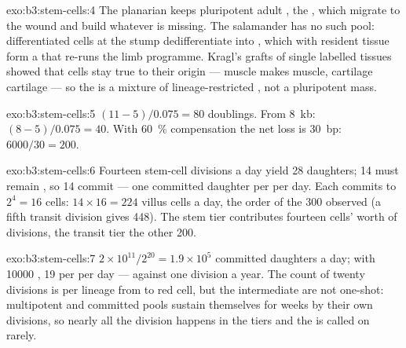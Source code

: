 \begin{solution}{exo:b3:stem-cells:4}
The planarian keeps pluripotent adult , the , which
migrate to the wound and build whatever is missing. The salamander has
no such pool: differentiated cells at the stump dedifferentiate into
, which with resident tissue  form a 
that re-runs the limb programme. Kragl's grafts of single labelled
tissues showed that  cells stay true to their origin ---
muscle makes muscle, cartilage cartilage --- so the  is a
mixture of lineage-restricted , not a pluripotent mass.
\end{solution}

\begin{solution}{exo:b3:stem-cells:5}
$(11 - 5)/0.075 = 80$ doublings. From \qty{8}{kb}: $(8 - 5)/0.075 = 40$.
With \qty{60}{\%} compensation the net loss is \qty{30}{bp}: $6000/30
= 200$.
\end{solution}

\begin{solution}{exo:b3:stem-cells:6}
Fourteen stem-cell divisions a day yield 28 daughters; 14 must remain
, so 14 commit --- one committed daughter per  per
day. Each commits to $2^{4} = 16$ cells: $14\times 16 = 224$ villus
cells a day, the order of the \num{300} observed (a fifth transit
division gives \num{448}). The stem tier contributes fourteen cells'
worth of divisions, the transit tier the other \num{200}.
\end{solution}

\begin{solution}{exo:b3:stem-cells:7}
$2\times 10^{11}/2^{20} = 1.9\times 10^{5}$ committed daughters a day;
with \num{10000} , 19 per  per day --- against one
division a year. The count of twenty divisions is per lineage from
 to red cell, but the intermediate  are not
one-shot: multipotent and committed  pools sustain themselves
for weeks by their own divisions, so nearly all the division happens
in the  tiers and the  is called on rarely.
\end{solution}


